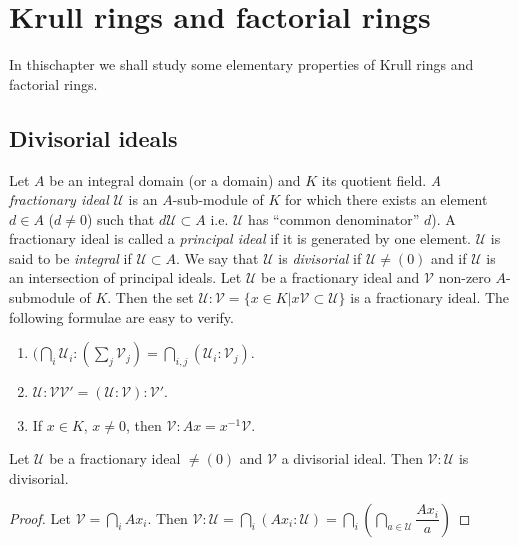 \chapter{Krull rings and factorial rings}\label{chap1}

In this\pageoriginale chapter we shall study some elementary
properties of Krull rings and factorial rings.   

\section{Divisorial ideals}\label{chap1:sec1}%
Let $A$ be an integral domain (or a domain) and $K$ its quotient
field. \textit{A fractionary ideal} $\mathscr{U}$ is an
$A$-sub-module of $K$ for which there exists an element $d \in A$ ($d
\neq 0$) such that $d \mathscr{U} \subset A$ i.e. $\mathscr{U}$ has
``common denominator'' $d$). A fractionary ideal is called a 
\textit{principal ideal} if it is generated by one
element. $\mathscr{U}$ is said to be \textit{integral} if
$\mathscr{U}\subset A$. We say that 
$\mathscr{U}$ is \textit{divisorial} if $\mathscr{U} \neq (0)$ and if
$\mathscr{U}$ is an intersection of principal ideals. Let
$\mathscr{U}$ be a fractionary ideal and $\mathscr{V}$ non-zero
$A$-submodule of $K$. Then the set $\mathscr{U} : \mathscr{V} = \big
\{x \in K \big| x \mathscr{V} \subset \mathscr{U} \big\} $ is a
fractionary ideal. The following formulae are easy to verify. 
\begin{enumerate}[(1)]
\item $(\bigcap\limits_{i} \mathscr{U}_i : (\sum\limits_j
  \mathscr{V}_j) = \bigcap\limits _{i, j} ( \mathscr{U}_i :
  \mathscr{V}_j)$. 

\item $\mathscr{U} : \mathscr{V} \mathscr{V}' = (\mathscr{U} :
  \mathscr{V}) : \mathscr{V}'$. 

\item If $x \in K$, $x \neq 0$, then $\mathscr{V} : Ax = x^{-1}
  \mathscr{V}$. 
\end{enumerate}

\begin{lemma}\label{chap1:lem1.1} %
Let $\mathscr{U}$ be a fractionary ideal $\neq (0)$ and $\mathscr{V}$
a divisorial ideal. Then $\mathscr{V} : \mathscr{U}$ is divisorial. 
\end{lemma}

\begin{proof}
Let $\mathscr{V} = \bigcap\limits_{i} Ax_i $. Then $\mathscr{V} :
\mathscr{U} = \bigcap\limits_i (Ax_i : \mathscr{U}) = \bigcap\limits_i
(\bigcap\limits_{a \in \mathscr{U}} \dfrac{Ax_i}{a})$ 
\end{proof}

